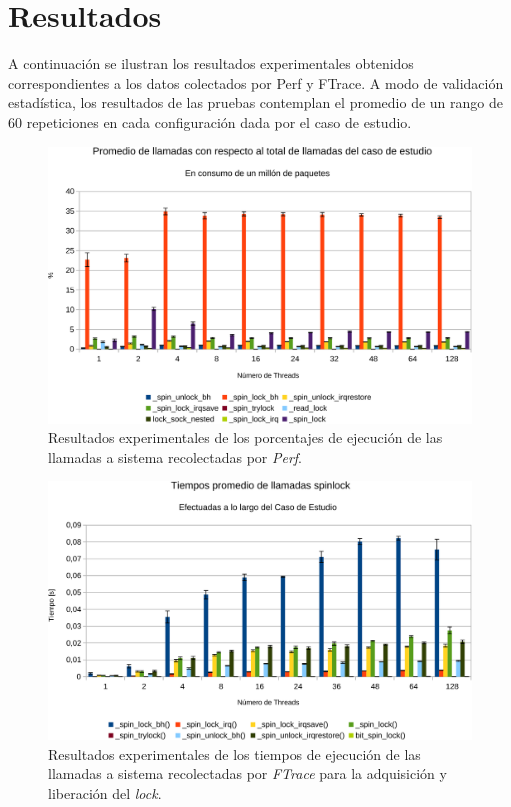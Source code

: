 \section{Resultados}
A continuación se ilustran los resultados experimentales obtenidos correspondientes a los datos colectados por Perf y FTrace. A modo de validación estadística, los resultados de las pruebas contemplan el promedio de un rango de 60 repeticiones en cada configuración dada por el caso de estudio.

\begin{figure}[!h]
	\centering
	\includegraphics[scale=.6]{resultados/perfdetalle-crop.pdf}
	\caption{Resultados experimentales de los porcentajes de ejecución de las llamadas a sistema recolectadas por \emph{Perf}.}
	\label{fig:resPerf}
\end{figure}

\begin{figure}[!h]
	\centering
	\includegraphics[scale=.6]{resultados/detalleFtrace-crop.pdf}
	\caption{Resultados experimentales de los tiempos de ejecución de las llamadas a sistema recolectadas por \emph{FTrace} para la adquisición y liberación del \emph{lock}.}
	\label{fig:detalleftrace}
\end{figure}


